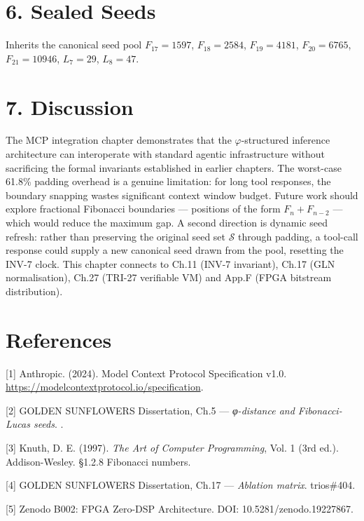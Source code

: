 \section{6. Sealed Seeds}\label{fa_23:sealed-seeds}

Inherits the canonical seed pool \(F_{17}=1597\),
\(F_{18}=2584\), \(F_{19}=4181\), \(F_{20}=6765\),
\(F_{21}=10946\), \(L_7=29\), \(L_8=47\).

\section{7. Discussion}\label{fa_23:discussion}

The MCP integration chapter demonstrates that the
\(\varphi\)-structured inference architecture can
interoperate with standard agentic infrastructure
without sacrificing the formal invariants
established in earlier chapters. The worst-case
61.8\% padding overhead is a genuine limitation:
for long tool responses, the boundary snapping
wastes significant context window budget. Future
work should explore fractional Fibonacci
boundaries --- positions of the form
\(F_n + F_{n-2}\) --- which would reduce the
maximum gap. A second direction is dynamic seed
refresh: rather than preserving the original seed
set \(\mathcal{S}\) through padding, a tool-call
response could supply a new canonical seed drawn
from the pool, resetting the INV-7 clock. This
chapter connects to Ch.11 (INV-7 invariant), Ch.17
(GLN normalisation), Ch.27 (TRI-27 verifiable VM)
and App.F (FPGA bitstream distribution).

\section{References}\label{fa_23:references}

[1] Anthropic. (2024). Model Context Protocol
Specification v1.0.
\url{https://modelcontextprotocol.io/specification}.

[2] GOLDEN SUNFLOWERS Dissertation, Ch.5 ---
\emph{φ-distance and Fibonacci-Lucas seeds}.
.

[3] Knuth, D. E. (1997). \emph{The Art of
Computer Programming}, Vol. 1 (3rd ed.).
Addison-Wesley. §1.2.8 Fibonacci numbers.

[4] GOLDEN SUNFLOWERS Dissertation, Ch.17 ---
\emph{Ablation matrix}. trios\#404.

[5] Zenodo B002: FPGA Zero-DSP Architecture.
DOI: 10.5281/zenodo.19227867.

